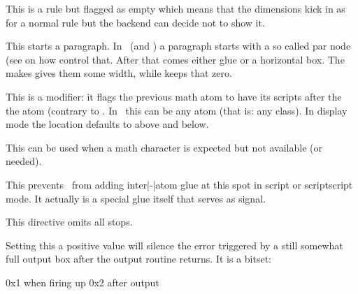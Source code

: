 \typebuffer

\startlines
\getbuffer
\stoplines

\stopoldprimitive

\startnewprimitive[title={\prm {nohrule}}]

This is a rule but flagged as empty which means that the dimensions kick in as
for a normal rule but the backend can decide not to show it.

\stopnewprimitive

\startoldprimitive[title={\prm {noindent}}]

This starts a paragraph. In \LUATEX\ (and \LUAMETATEX) a paragraph starts with a
so called par node (see  on how control that. After that comes
either  glue or a horizontal box. The  makes gives
them some width, while  keeps that zero.

\stopoldprimitive

\startoldprimitive[title={\prm {nolimits}}]

This is a modifier: it flags the previous math atom to have its scripts after the
the atom (contrary to . In \LUAMETATEX\ this can be any atom (that
is: any class). In display mode the location defaults to above and below.

\stopoldprimitive

\startnewprimitive[title={\prm {nomathchar}}]

This can be used when a math character is expected but not available (or needed).

\stopnewprimitive

\startoldprimitive[title={\prm {nonscript}}]

This prevents \TEX\ from adding inter|-|atom glue at this spot in script or
scriptscript mode. It actually is a special glue itself that serves as signal.

\stopoldprimitive

\startoldprimitive[title={\prm {nonstopmode}}]

This directive omits all stops.

\stopoldprimitive

\startnewprimitive[title={\prm {nooutputboxerror}}]

Setting this a positive value will silence the error triggered by a still
somewhat full output box after the output routine returns. It is a bitset:

\starttabulate[|T||]
\NC 0x1 \NC when firing up \NC \NR
\NC 0x2 \NC after output   \NC \NR
\stoptabulate

